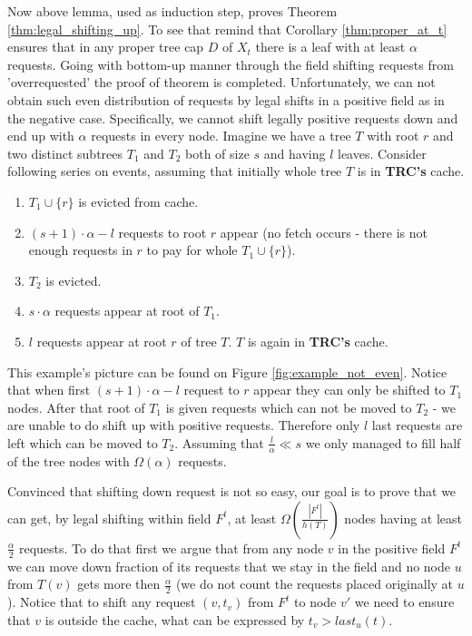 Now above lemma, used as induction step, proves Theorem 
\ref{thm:legal_shifting_up}. To see that remind that 
Corollary \ref{thm:proper_at_t} ensures that in any proper tree cap $D$ of 
$X_t$ there is a leaf with at least $\alpha$ requests. Going with bottom-up 
manner through the field shifting requests from 'overrequested' the proof of 
theorem is completed.   
Unfortunately, we can not obtain such even distribution of requests by legal 
shifts in a positive field as in the negative case. Specifically, we cannot 
shift legally positive requests down and end up with $\alpha$ requests in every 
node. Imagine we have a tree $T$ with root $r$ and two distinct subtrees $T_1$ 
and $T_2$ both of size $s$ and having $l$ leaves. Consider following series on 
events, assuming that initially whole tree $T$ is in \textbf{TRC's} cache.
\begin{enumerate}
 \item $T_1 \cup \{r\}$ is evicted from cache.
 \item $(s+1) \cdot \alpha - l$ requests to root $r$ appear (no fetch occurs - 
there is not enough requests in $r$ to pay for whole $T_1 \cup \{r\}$).
 \item $T_2$ is evicted.
 \item $s \cdot \alpha$ requests appear at root of $T_1$.
 \item $l$ requests appear at root $r$ of tree $T$. $T$ is again in 
\textbf{TRC's} cache.
\end{enumerate}
This example's picture can be found on Figure \ref{fig:example_not_even}. 
Notice that when first $(s+1) \cdot \alpha - l$ request to $r$ appear they can 
only be shifted to $T_1$ nodes. After that root of $T_1$ is given requests 
which can not be moved to $T_2$ - we are unable to do shift up with positive 
requests. Therefore only $l$ last requests are left which can be moved to 
$T_2$. Assuming that $\frac{l}{\alpha} \ll s$ we only managed to fill half of 
the tree nodes with $\Omega(\alpha)$ requests.   

Convinced that shifting down request is not so easy, our goal is to prove that 
we can get, by legal shifting within field $F^t$, 
at least $\Omega(\frac{|F^t|}{h(T)})$ nodes having at least $\frac{\alpha}{2}$ 
requests. To do that first we argue that from any node $v$ in the positive 
field $F^t$ we can move down fraction of its requests that we stay in the field 
and no node $u$ from $T(v)$ gets more then $\frac{\alpha}{2}$ (we do not count 
the requests placed originally at $u$). Notice that to shift any request $(v, 
t_v)$ from $F^t$ to node $v'$ we need to ensure that $v$ is outside the cache, 
what can be expressed by $t_v > last_u(t)$.

